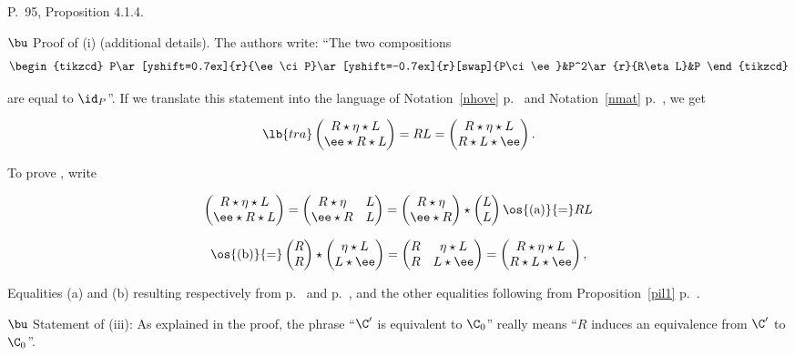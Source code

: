 \documentclass[12pt]{article}
\theoremstyle{remark}
\theoremstyle{definition}
\begin{document}
\begin{s} 
P.~95, Proposition 4.1.4.

\nn$\bu$ Proof of (i) (additional details). The authors write: ``The two compositions 
$$
\begin{tikzcd}
P\ar[yshift=0.7ex]{r}{\ee\ci P}\ar[yshift=-0.7ex]{r}[swap]{P\ci\ee}&P^2\ar{r}{R\eta L}&P
\end{tikzcd}
$$ 

\nn are equal to $\id_P$''. If we translate this statement into the language of Notation~\ref{nhove} p.~ and Notation~\ref{nmat} p.~, we get 

\begin{equation}\lb{tra}
\begin{pmatrix}R\star\eta\star L\\ \ee\star R\star L\end{pmatrix}
=RL=\begin{pmatrix}R\star\eta\star L\\ R\star L\star\ee\end{pmatrix}.
\end{equation}

\nn To prove , write 

$$
\begin{pmatrix}R\star\eta\star L\\ \ee\star R\star L\end{pmatrix}
=\begin{pmatrix}R\star\eta&L\\ \ee\star R&L\end{pmatrix}
=\begin{pmatrix}R\star\eta\\ \ee\star R\end{pmatrix}\star\begin{pmatrix}L\\ L\end{pmatrix}
\os{\text{(a)}}{=}RL
$$

$$
\os{\text{(b)}}{=}\begin{pmatrix}R\\ R\end{pmatrix}\star\begin{pmatrix}\eta\star L\\ L\star\ee\end{pmatrix}
=\begin{pmatrix}R&\eta\star L\\ R&L\star\ee\end{pmatrix}
=\begin{pmatrix}R\star\eta\star L\\ R\star L\star\ee\end{pmatrix},
$$ 

\nn Equalities (a) and (b) resulting respectively from  p.~ and  p.~, and the other equalities following from Proposition~\ref{pil1} p.~.

\nn$\bu$ Statement of (iii): As explained in the proof, the phrase ``$\C'$ is equivalent to $\C_0$'' really means ``$R$ induces an equivalence from $\C'$ to $\C_0$''. 
\end{s}
\end{document}
